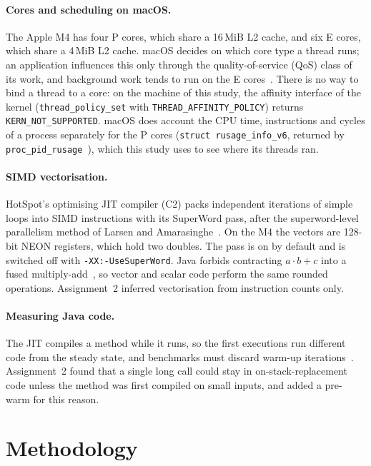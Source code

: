 \documentclass[11pt,a4paper]{article}
\begin{document}
\paragraph{Cores and scheduling on macOS.} The Apple M4 has four P cores,
which share a 16\,MiB L2 cache, and six E cores, which share a 4\,MiB L2 cache.
macOS decides on which core type a thread runs; an application influences this
only through the quality-of-service (QoS) class of its work, and background
work tends to run on the E cores~\cite{appletuning}. There is no way to bind a
thread to a core: on the machine of this study, the affinity interface of the
kernel (\texttt{thread\_policy\_set} with \texttt{THREAD\_AFFINITY\_POLICY})
returns \texttt{KERN\_NOT\_SUPPORTED}. macOS does account the CPU time,
instructions and cycles of a process separately for the P cores
(\texttt{struct rusage\_info\_v6}, returned by
\texttt{proc\_pid\_rusage}~\cite{macsdk}), which this study uses to see where
its threads ran.

\paragraph{SIMD vectorisation.} HotSpot's optimising JIT compiler (C2) packs
independent iterations of simple loops into SIMD instructions with its
SuperWord pass, after the superword-level parallelism method of Larsen and
Amarasinghe~\cite{larsen2000}. On the M4 the vectors are 128-bit NEON registers,
which hold two doubles. The pass is on by default and is switched off with
\texttt{-XX:-UseSuperWord}. Java forbids contracting $a\cdot b+c$ into a fused
multiply-add~\cite{jep306}, so vector and scalar code perform the same rounded
operations. Assignment~2 inferred vectorisation from instruction counts only.

\paragraph{Measuring Java code.} The JIT compiles a method while it runs, so
the first executions run different code from the steady state, and benchmarks
must discard warm-up iterations~\cite{georges2007}. Assignment~2 found that a
single long call could stay in on-stack-replacement code unless the method was
first compiled on small inputs, and added a pre-warm for this reason.

\section{Methodology}
\label{sec:method}
\end{document}
